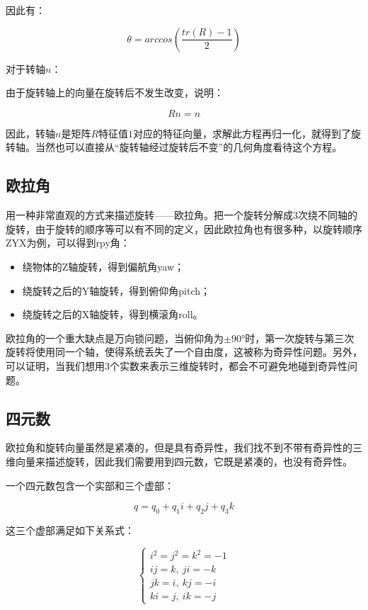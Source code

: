\documentclass[10pt, oneside]{book}
\begin{document}
因此有：

\begin{equation}
    \theta = arccos(\frac{tr(R)-1}{2}) 
\end{equation}

对于转轴$n$：

由于旋转轴上的向量在旋转后不发生改变，说明：

\begin{equation}
    Rn = n
\end{equation}

因此，转轴$n$是矩阵$R$特征值$1$对应的特征向量，求解此方程再归一化，就得到了旋转轴。当然也可以直接从“旋转轴经过旋转后不变”的几何角度看待这个方程。

\subsection{欧拉角}

用一种非常直观的方式来描述旋转——欧拉角。把一个旋转分解成3次绕不同轴的旋转，由于旋转的顺序等可以有不同的定义，因此欧拉角也有很多种，以旋转顺序ZYX为例，可以得到rpy角：

\begin{itemize}
    \item 绕物体的Z轴旋转，得到偏航角yaw；
    \item 绕旋转之后的Y轴旋转，得到俯仰角pitch；
    \item 绕旋转之后的X轴旋转，得到横滚角roll。
\end{itemize}

欧拉角的一个重大缺点是万向锁问题，当俯仰角为$\pm90°$时，第一次旋转与第三次旋转将使用同一个轴，使得系统丢失了一个自由度，这被称为奇异性问题。另外，可以证明，当我们想用3个实数来表示三维旋转时，都会不可避免地碰到奇异性问题。

\subsection{四元数}

欧拉角和旋转向量虽然是紧凑的，但是具有奇异性，我们找不到不带有奇异性的三维向量来描述旋转，因此我们需要用到四元数，它既是紧凑的，也没有奇异性。

一个四元数包含一个实部和三个虚部：

\begin{equation}
    q = q_0 + q_1i + q_2j + q_3k
\end{equation}

这三个虚部满足如下关系式：

\begin{equation}
    \begin{cases}
        i^2 = j^2 = k^2 = -1 \\
        ij = k, \ ji = -k \\ 
        jk = i, \ kj = -i \\
        ki = j, \ ik = -j
     \end{cases}
\end{equation}
\end{document}
